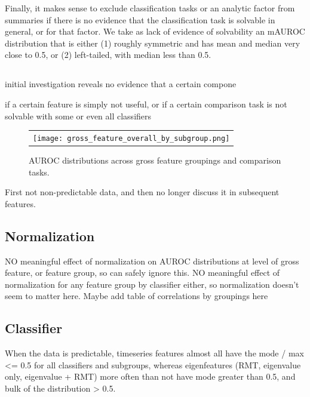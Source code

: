 \documentclass[12pt]{spieman}  %
\begin{document}
\begin{spacing}{2}
Finally, it makes sense to exclude classification tasks or an analytic
factor from summaries if there is no evidence that the classification task is
solvable in general, or for that factor. We take as lack of evidence of solvability
an mAUROC distribution that is either (1) roughly symmetric and has mean and median
very close to 0.5, or (2) left-tailed, with median less than 0.5.

\subsection{}

initial investigation reveals no evidence
that a certain compone




  if a certain feature is simply not useful, or if a certain comparison
task is not solvable with some or even all classifiers


\label{sec:results}

\begin{figure}
\begin{center}
\begin{tabular}{c}
\texttt{[image: gross\_feature\_overall\_by\_subgroup.png]}
\end{tabular}
\end{center}
\caption
{ \label{fig:main-results}
AUROC distributions across gross feature groupings and comparison tasks.}
\end{figure}

First not non-predictable data, and then no longer discuss it in subsequent features.

\subsection{Normalization}
NO meaningful effect of normalization on AUROC distributions at level of gross feature, or feature
group, so can safely ignore this.
NO meaningful effect of normalization for any feature group by classifier either, so
normalization doesn't seem to matter here.
Maybe add table of correlations by groupings here

\subsection{Classifier}
When the data is predictable, timeseries features almost all have the mode / max <= 0.5 for all
classifiers and subgroups, whereas eigenfeatures (RMT, eigenvalue only, eigenvalue + RMT) more often
than not have mode greater than 0.5, and bulk of the distribution > 0.5.


\end{spacing}
\end{document}
